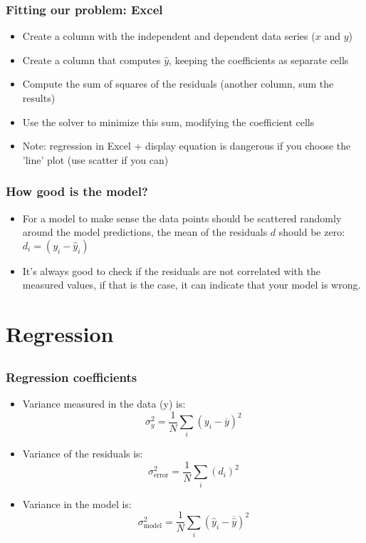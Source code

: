 \documentclass[11pt,table,final,fleqn,xcolor={usenames,dvipsnames,table}]{beamer}
\begin{document}
\begin{frame}[fragile] 
  \frametitle{Fitting our problem: Excel}
    \begin{itemize}
      \item Create a column with the independent and dependent data series ($x$ and $y$)
      \item Create a column that computes $\hat{y}$, keeping the coefficients as separate cells
      \item Compute the sum of squares of the residuals (another column, sum the results)
      \item Use the solver to minimize this sum, modifying the coefficient cells
      \item Note: regression in Excel + display equation is dangerous if you choose the 'line' plot (use scatter if you can)
    \end{itemize}
\end{frame}

\begin{frame}[fragile] 
  \frametitle{How good is the model?}
  

  \begin{itemize}
    \item For a model to make sense the data points should be scattered randomly around the model predictions, the mean of the residuals $d$ should be zero: $d_i = \left( y_i - \hat{y}_i\right)$
    \item It’s always good to check if the residuals are not correlated with the measured values, if that is the case, it can indicate that your model is wrong.
  \end{itemize}
\end{frame}

\section{Regression}
\subsection*{}
\begin{frame}[fragile] 
  \frametitle{Regression coefficients}
    \begin{itemize}
    \item Variance measured in the data (y) is:
    \[
      \sigma^2_y = \frac{1}{N} \sum_i \left (y_i - \overline{y}\right)^2
    \]
    \item Variance of the residuals is:
    \[
      \sigma^2_\text{error} = \frac{1}{N} \sum_i \left (d_i\right)^2
    \]
        \item Variance in the model is:
    \[
      \sigma^2_\text{model} = \frac{1}{N} \sum_i \left (\hat{y}_i - \overline{\hat{y}}\right)^2
    \]
  \end{itemize}
\end{frame}
\end{document}

